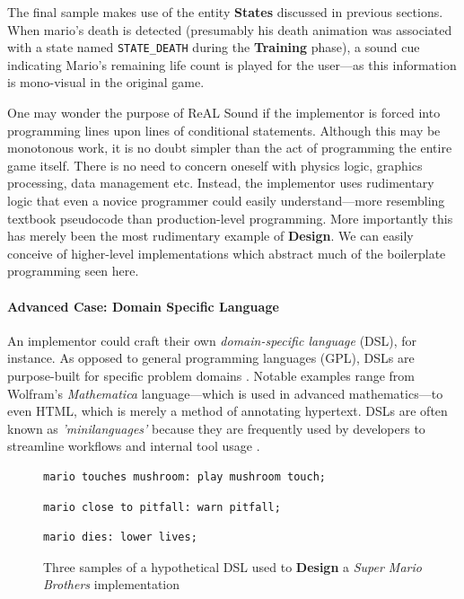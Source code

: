 \documentclass{report}
\newcommand{\rs}{ReAL Sound\xspace}
\newcommand{\train}{\textbf{Training}\xspace}
\newcommand{\design}{\textbf{Design}\xspace}
\newcommand{\state}[1]{\textbf{#1}}
\newcommand{\imp}{implementor\xspace}
\begin{document}
The final sample makes use of the entity \state{States} discussed in previous sections. When mario's death is detected (presumably his death animation was associated with a state named \texttt{STATE\_DEATH} during the \train phase), a sound cue indicating Mario's remaining life count is played for the user---as this information is mono-visual in the original game. 


One may wonder the purpose of \rs if the \imp is forced into programming lines upon lines of conditional statements. Although this may be monotonous work, it is no doubt simpler than the act of programming the entire game itself. There is no need to concern oneself with physics logic, graphics processing, data management etc. Instead, the \imp uses rudimentary logic that even a novice programmer could easily understand---more resembling textbook pseudocode than production-level programming. More importantly this has merely been the most rudimentary example of \design. We can easily conceive of higher-level implementations which abstract much of the boilerplate programming seen here. 

\paragraph{Advanced Case: Domain Specific Language}
An \imp could craft their own \emph{domain-specific language} (DSL), for instance. As opposed to general programming languages (GPL), DSLs are purpose-built for specific problem domains \cite{DSL}. Notable examples range from Wolfram's \emph{Mathematica} language---which is used in advanced mathematics---to even HTML, which is merely a method of annotating hypertext. DSLs are often known as \emph{'minilanguages'} because they are frequently used by developers to streamline workflows and internal tool usage \cite{UnixProg}. 

\begin{figure}[h]

\lstset{language=Python}
\begin{lstlisting}[frame=single]
    mario touches mushroom: play mushroom touch;
\end{lstlisting}
    
\begin{lstlisting}[frame=single]
    mario close to pitfall: warn pitfall;
\end{lstlisting}

\begin{lstlisting}[frame=single]
    mario dies: lower lives;
\end{lstlisting}

    \caption{Three samples of a hypothetical DSL used to \design a \emph{Super Mario Brothers} implementation}
    \label{fig:dsl_examples}
\end{figure}
\end{document}

